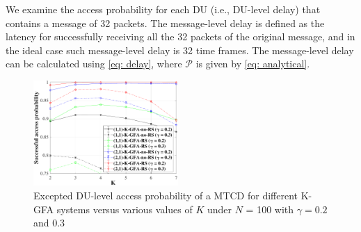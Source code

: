 \documentclass[a4paper]{IEEEtran}
\begin{document}
We examine the access probability for each DU (i.e., DU-level delay) that contains a message of 32 packets. The message-level delay is defined as the latency for successfully receiving all the 32 packets of the original message, and in the ideal case such message-level delay is 32 time frames. The message-level delay can be calculated using \eqref{eq: delay}, where $\mathcal{P}$ is given by \eqref{eq: analytical}.

\begin{figure}[ht!]
    \centering
    \includegraphics[width=0.49\textwidth]{Figs/analy_sim_vers_KV4.pdf}
    \caption{Excepted DU-level access probability of a MTCD for different K-GFA systems versus various values of $K$ under $N$ = 100 with $\gamma = 0.2$ and 0.3}
    \label{fig: result_1}
\end{figure}
\end{document}
